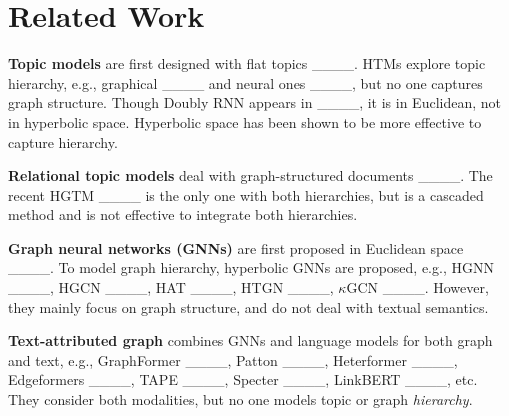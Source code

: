 \section{Related Work}

\textbf{Topic models} are first designed with flat topics ____. HTMs explore topic hierarchy, e.g., graphical ____ and neural ones ____, but no one captures graph structure. Though Doubly RNN appears in ____, it is in Euclidean, not in hyperbolic space. Hyperbolic space has been shown to be more effective to capture hierarchy.

\textbf{Relational topic models} deal with graph-structured documents ____. %
The recent HGTM ____ is the only one with both hierarchies, but is a cascaded method and is not effective to integrate both hierarchies. %

\textbf{Graph neural networks (GNNs)} are first proposed in Euclidean space ____. To model graph hierarchy, hyperbolic GNNs are proposed, e.g., HGNN ____, HGCN ____, HAT ____, HTGN ____, $\kappa$GCN ____. However, they mainly focus on graph structure, and do not deal with textual semantics.

\textbf{Text-attributed graph} combines GNNs and language models for both graph and text, e.g., GraphFormer ____, Patton ____, Heterformer ____, Edgeformers ____, TAPE ____, Specter ____, LinkBERT ____, etc. They consider both modalities, but no one models topic or graph \emph{hierarchy}.